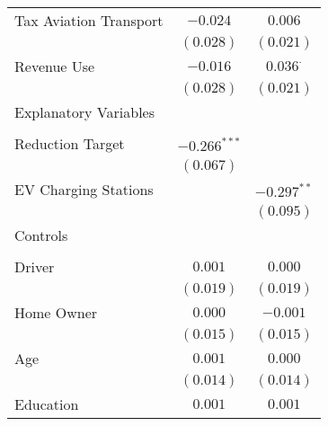 \begin{center}
\begin{tiny}
\begin{longtable}{l@{} c@{} c@{}}
\quad Tax Aviation Transport                             & $-0.024$         & $0.006$          \\
                                                         & $(0.028)$        & $(0.021)$        \\
\quad Revenue Use                                        & $-0.016$         & $0.036^{\cdot}$  \\
                                                         & $(0.028)$        & $(0.021)$        \\
Explanatory Variables                                    &                  &                  \\
                                                         &                  &                  \\
\quad Reduction Target                                   & $-0.266^{***}$   &                  \\
                                                         & $(0.067)$        &                  \\
\quad EV Charging Stations                               &                  & $-0.297^{**}$    \\
                                                         &                  & $(0.095)$        \\
Controls                                                 &                  &                  \\
                                                         &                  &                  \\
\quad Driver                                             & $0.001$          & $0.000$          \\
                                                         & $(0.019)$        & $(0.019)$        \\
\quad Home Owner                                         & $0.000$          & $-0.001$         \\
                                                         & $(0.015)$        & $(0.015)$        \\
\quad Age                                                & $0.001$          & $0.000$          \\
                                                         & $(0.014)$        & $(0.014)$        \\
\quad Education                                          & $0.001$          & $0.001$          \\

\end{longtable}
\end{tiny}
\end{center}

